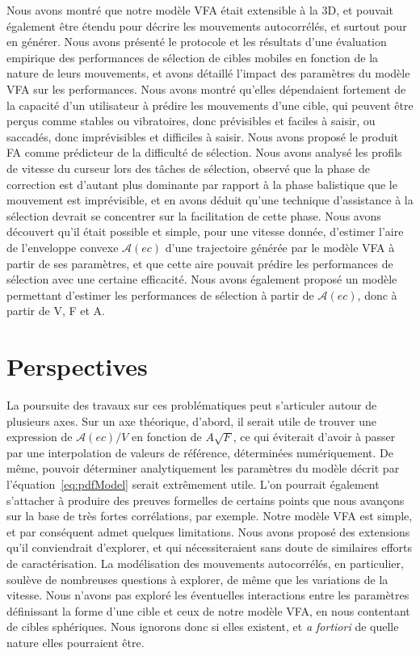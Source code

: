 	Nous avons montré que notre modèle VFA était extensible à la 3D, et pouvait également être étendu pour décrire les mouvements autocorrélés, et surtout pour en générer. Nous avons présenté le protocole et les résultats d'une évaluation empirique des performances de sélection de cibles mobiles en fonction de la nature de leurs mouvements, et avons détaillé l'impact des paramètres du modèle VFA sur les performances. Nous avons montré qu'elles dépendaient fortement de la capacité d'un utilisateur à prédire les mouvements d'une cible, qui peuvent être perçus comme stables ou vibratoires, donc prévisibles et faciles à saisir, ou saccadés, donc imprévisibles et difficiles à saisir. Nous avons proposé le produit FA comme prédicteur de la difficulté de sélection. Nous avons analysé les profils de vitesse du curseur lors des tâches de sélection, observé que la phase de correction est d'autant plus dominante par rapport à la phase balistique que le mouvement est imprévisible, et en avons déduit qu'une technique d'assistance à la sélection devrait se concentrer sur la facilitation de cette phase. Nous avons découvert qu'il était possible et simple, pour une vitesse donnée, d'estimer l'aire de l'enveloppe convexe $\mathcal{A}(ec)$ d'une trajectoire générée par le modèle VFA à partir de ses paramètres, et que cette aire pouvait prédire les performances de sélection avec une certaine efficacité. Nous avons également proposé un modèle permettant d'estimer les performances de sélection à partir de $\mathcal{A}(ec)$, donc à partir de V, F et A.
	
	\section*{Perspectives}
	La poursuite des travaux sur ces problématiques peut s'articuler autour de plusieurs axes. Sur un axe théorique, d'abord, il serait utile de trouver une expression de $\mathcal{A}(ec)/V$ en fonction de $A\sqrt{F}$, ce qui éviterait d'avoir à passer par une interpolation de valeurs de référence, déterminées numériquement. De même, pouvoir déterminer analytiquement les paramètres du modèle décrit par l'équation~\ref{eq:pdfModel} serait extrêmement utile. L'on pourrait également s'attacher à produire des preuves formelles de certains points que nous avançons sur la base de très fortes corrélations, par exemple. Notre modèle VFA est simple, et par conséquent admet quelques limitations. Nous avons proposé des extensions qu'il conviendrait d'explorer, et qui nécessiteraient sans doute de similaires efforts de caractérisation. La modélisation des mouvements autocorrélés, en particulier, soulève de nombreuses questions à explorer, de même que les variations de la vitesse. Nous n'avons pas exploré les éventuelles interactions entre les paramètres définissant la forme d'une cible et ceux de notre modèle VFA, en nous contentant de cibles sphériques. Nous ignorons donc si elles existent, et \emph{a fortiori} de quelle nature elles pourraient être.
	
